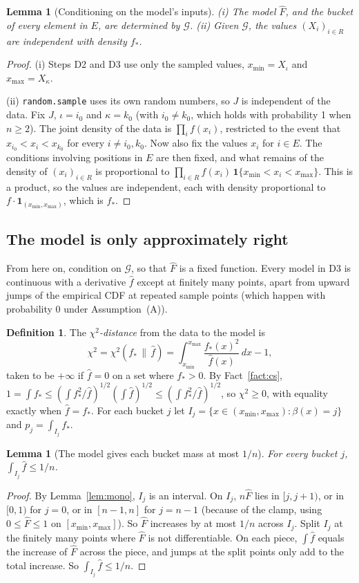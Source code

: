\documentclass[11pt]{article}
\newtheorem{lemma}[theorem]{Lemma}
\theoremstyle{definition}
\newtheorem{definition}[theorem]{Definition}
\theoremstyle{remark}
\newcommand{\Fh}{\widehat{F}}
\newcommand{\fh}{\widehat{f}}
\newcommand{\code}[1]{\texttt{#1}}
\newcommand{\xmin}{x_{\min}}
\newcommand{\xmax}{x_{\max}}
\newcommand{\G}{\mathcal{G}}
\begin{document}
\begin{lemma}[Conditioning on the model's inputs]\label{lem:condition}
\textup{(i)} The model $\Fh$, and the bucket of every element in $E$, are
determined by $\G$.
\textup{(ii)} Given $\G$, the values $(X_i)_{i\in R}$ are independent with
density $f_\ast$.
\end{lemma}
\begin{proof}
(i) Steps D2 and D3 use only the sampled values, $\xmin=X_\iota$ and
$\xmax=X_\kappa$.

(ii) \code{random.sample} uses its own random numbers, so $J$ is independent
of the data. Fix $J$, $\iota=i_0$ and $\kappa=k_0$ (with $i_0\ne k_0$, which
holds with probability 1 when $n\ge2$). The joint density of the data is
$\prod_i f(x_i)$, restricted to the event that $x_{i_0}<x_i<x_{k_0}$ for
every $i\ne i_0,k_0$. Now also fix the values $x_i$ for $i\in E$. The
conditions involving positions in $E$ are then fixed, and what remains of
the density of $(x_i)_{i\in R}$ is proportional to
$\prod_{i\in R}f(x_i)\,\mathbf 1\{\xmin<x_i<\xmax\}$. This is a product, so
the values are independent, each with density proportional to
$f\cdot\mathbf 1_{(\xmin,\xmax)}$, which is $f_\ast$.
\end{proof}

\subsection{The model is only approximately right}

From here on, condition on $\G$, so that $\Fh$ is a fixed function. Every
model in D3 is continuous with a derivative $\fh$ except at finitely many
points, apart from upward jumps of the empirical CDF at repeated sample
points (which happen with probability 0 under Assumption~(A)).

\begin{definition}
The \emph{$\chi^2$-distance} from the data to the model is
\[
\chi^2=\chi^2(f_\ast\,\|\,\fh)=\int_{\xmin}^{\xmax}\frac{f_\ast(x)^2}{\fh(x)}\,dx-1,
\]
taken to be $+\infty$ if $\fh=0$ on a set where $f_\ast>0$. By
Fact~\ref{fact:cs}, $1=\int f_\ast\le(\int f_\ast^2/\fh)^{1/2}(\int\fh)^{1/2}
\le(\int f_\ast^2/\fh)^{1/2}$, so $\chi^2\ge0$, with equality exactly when
$\fh=f_\ast$. For each bucket $j$ let
$I_j=\{x\in(\xmin,\xmax):\beta(x)=j\}$ and $p_j=\int_{I_j}f_\ast$.
\end{definition}

\begin{lemma}[The model gives each bucket mass at most $1/n$]\label{lem:mass}
For every bucket $j$, $\int_{I_j}\fh\le1/n$.
\end{lemma}
\begin{proof}
By Lemma~\ref{lem:mono}, $I_j$ is an interval. On $I_j$, $n\Fh$ lies in
$[j,j+1)$, or in $[0,1)$ for $j=0$, or in $[n-1,n]$ for $j=n-1$ (because of
the clamp, using $0\le\Fh\le1$ on $[\xmin,\xmax]$). So $\Fh$ increases by at
most $1/n$ across $I_j$. Split $I_j$ at the finitely many points where
$\Fh$ is not differentiable. On each piece, $\int\fh$ equals the increase of
$\Fh$ across the piece, and jumps at the split points only add to the
total increase. So $\int_{I_j}\fh\le1/n$.
\end{proof}
\end{document}
